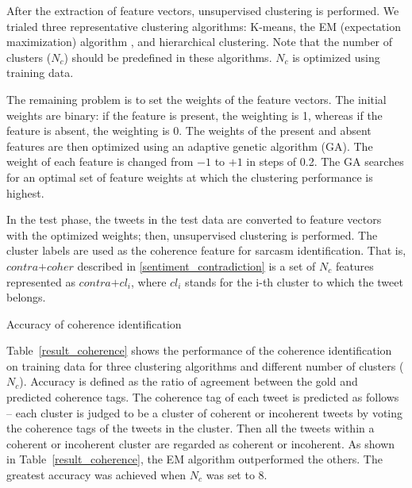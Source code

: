 \documentclass[english]{jnlp_1.4}
\begin{document}
After the extraction of feature vectors, unsupervised clustering is performed.
We trialed three representative clustering algorithms: K-means, the EM (expectation maximization) algorithm \cite{Mclachlan_2008}, and hierarchical clustering.
Note that the number of clusters ($N_c$) should be predefined in these algorithms. $N_c$ is optimized using training data.

The remaining problem is to set the weights of the feature vectors.
The initial weights are binary: if the feature is present, the weighting is 1, whereas if the feature is absent, the weighting is 0.
The weights of the present and absent features are then optimized using an adaptive genetic algorithm (GA).
The weight of each feature is changed from $-1$ to $+1$ in steps of 0.2.
The GA searches for an optimal set of feature weights at which the clustering performance is highest.

In the test phase, the tweets in the test data are converted to feature vectors with the optimized weights; then, unsupervised clustering is performed.
The cluster labels are used as the coherence feature for sarcasm identification.
That is, $contra\mathrm{+}coher$ described in \ref{sentiment_contradiction} is a set of $N_c$ features represented as $contra\mathrm{+}cl_i$, where $cl_i$ stands for the i-th cluster to which the tweet belongs.

\begin{table}[b]
\caption{Accuracy of coherence identification}
\label{result_coherence}

\end{table}

Table~\ref{result_coherence} shows the performance of the coherence identification on training data for three clustering algorithms and different number of clusters ($N_c$).
Accuracy is defined as the ratio of agreement between the gold and predicted coherence tags.
The coherence tag of each tweet is predicted as follows -- each cluster is judged to be a cluster of coherent or incoherent tweets by voting the coherence tags of the tweets in the cluster.
Then all the tweets within a coherent or incoherent cluster are regarded as coherent or incoherent.
As shown in Table~\ref{result_coherence}, the EM algorithm outperformed the others.
The greatest accuracy was achieved when $N_c$ was set to 8.
\end{document}
